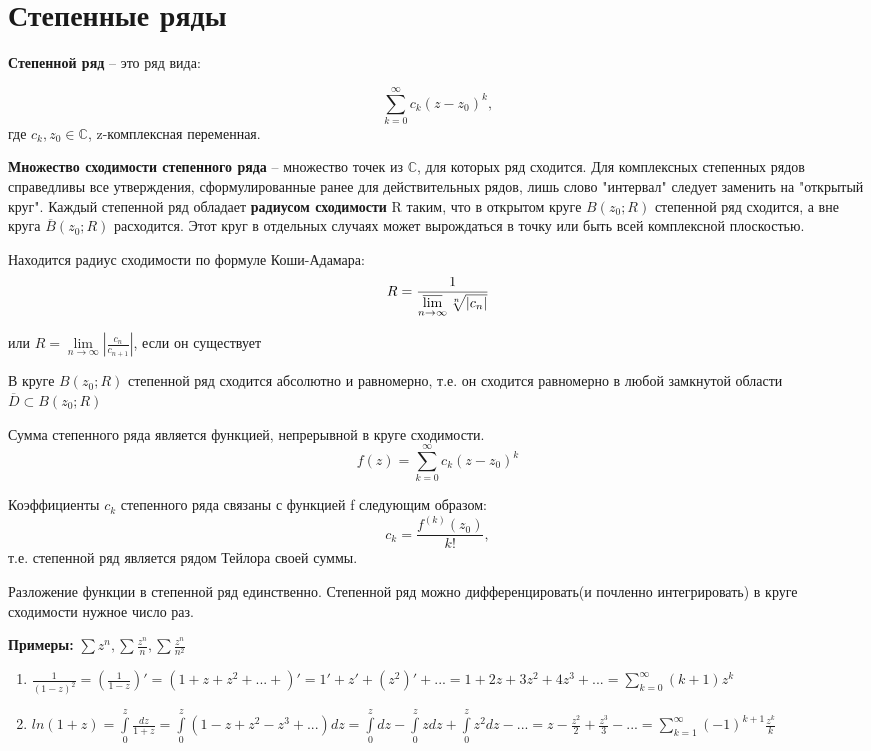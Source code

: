\documentclass[a4paper, 12pt]{report}
\begin{document}
\section{Степенные ряды}  

\textbf{Степенной ряд} -- это ряд вида:

$$\sum\limits_{k=0}^\infty c_k (z-z_0)^k,$$ где $c_k, z_0 \in \mathbb{C}$, z-комплексная переменная.

\par\bigskip
\textbf{Множество сходимости степенного ряда} -- множество точек из $\mathbb{C}$, для которых ряд сходится. Для комплексных степенных рядов справедливы все утверждения, сформулированные ранее для действительных рядов, лишь слово "интервал" следует заменить на "открытый круг". Каждый степенной ряд обладает \textbf{радиусом сходимости} R таким, что в открытом круге $B(z_0;R)$ степенной ряд сходится, а вне круга $\overline{B}(z_0;R)$ расходится. Этот круг в отдельных случаях может вырождаться в точку или быть всей комплексной плоскостью. 
\par\bigskip
Находится радиус сходимости по формуле Коши-Адамара:
$$R=\frac1{\varlimsup\limits_{n \to \infty} \sqrt[n]{|c_n|}}$$
\par или $R=\lim\limits_{n \to \infty} \left| \frac{c_n}{c_{n+1}} \right|$, если он существует

\par\bigskip
В круге $B(z_0;R)$ степенной ряд сходится абсолютно и равномерно, т.е. он сходится равномерно в любой замкнутой области $\overline{D} \subset B(z_0;R) $

Сумма степенного ряда является функцией, непрерывной в круге сходимости.
$$f(z)=\sum\limits_{k=0}^\infty c_k(z-z_0)^k$$

Коэффициенты $c_k$ степенного ряда связаны с функцией f следующим образом:
$$c_k=\frac{f^{(k)}(z_0)}{k!},$$ т.е. степенной ряд является рядом Тейлора своей суммы.
\par\bigskip
Разложение функции в степенной ряд единственно. Степенной ряд можно дифференцировать(и почленно интегрировать) в круге сходимости нужное число раз.

\par\bigskip
\textbf{Примеры:} $\sum z^n, \sum \frac{z^n}{n}, \sum \frac{z^n}{n^2}$

\begin{enumerate}
    \item $\frac1{(1-z)^2}=\left( \frac1{1-z}\right)'=(1+z+z^2+...+)'=1'+z'+(z^2)'+... =1+2z+3z^2+4z^3+...=\sum\limits_{k=0}^\infty (k+1)z^k$
    \item $ln(1+z)=\int\limits_0^z \frac{dz}{1+z}=\int\limits_0^z (1-z+z^2-z^3+...)dz=\int\limits_0^z dz-\int\limits_0^z zdz+\int\limits_0^z z^2dz-...=z-\frac{z^2}{2}+\frac{z^3}{3}-...=\sum\limits_{k=1}^\infty (-1)^{k+1} \frac{z^k}{k}$
\end{enumerate}
\end{document}
